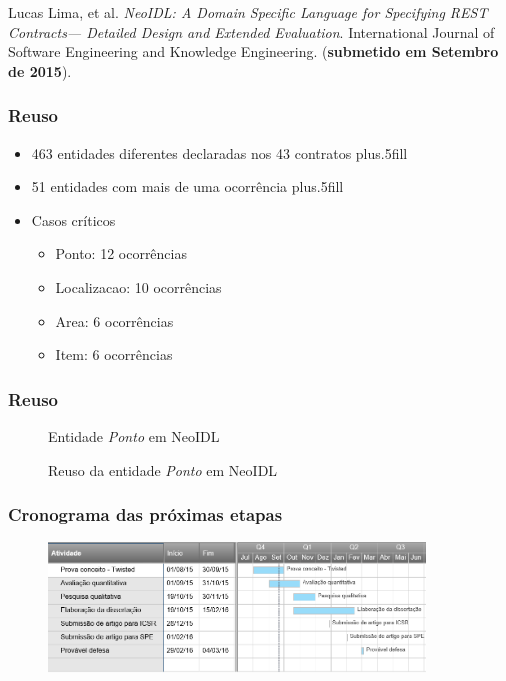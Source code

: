 \documentclass{beamer}
\begin{document}
\begin{frame}

Lucas Lima, et al. \emph{NeoIDL: A Domain Specific Language for Specifying REST
Contracts--- Detailed Design and Extended Evaluation}. International Journal of
Software Engineering and Knowledge Engineering. ({\bf submetido em 
Setembro de 2015}).

\end{frame}

\begin{frame}
\frametitle{Reuso}
\begin{itemize}
  \item 463 entidades diferentes declaradas nos 43 contratos
  \vskip0pt plus.5fill
  \pause
  \item 51 entidades com mais de uma ocorrência
  \vskip0pt plus.5fill
  \pause
  \item Casos críticos
  \begin{itemize}
	\item Ponto: 12 ocorrências
	\item Localizacao: 10 ocorrências
	\item Area: 6 ocorrências
	\item Item: 6 ocorrências
  \end{itemize}  
\end{itemize}

\end{frame}


\begin{frame}
\frametitle{Reuso}

\begin{figure}[htb]
\begin{tiny}

\end{tiny}
Entidade \emph{Ponto} em NeoIDL
\end{figure}

\begin{figure}[htb]
\begin{tiny}

\end{tiny}
Reuso da entidade \emph{Ponto} em NeoIDL	
\end{figure}

\end{frame}

\begin{frame}
\frametitle{Cronograma das próximas etapas} 

\begin{figure}[h] 
\includegraphics[width=10cm]{Gantt.png}

\end{figure}

\end{frame}
\end{document}

